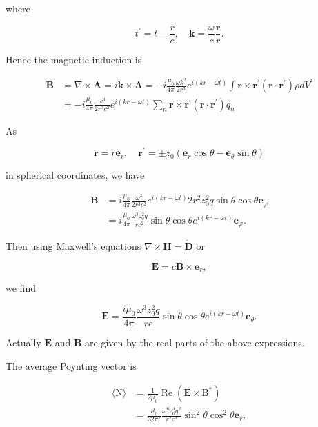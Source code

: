 \documentclass[10pt]{article}
\begin{document}
where

$$
t^{\prime}=t-\frac{r}{c}, \quad \mathbf{k}=\frac{\omega}{c} \frac{\mathbf{r}}{r} .
$$



Hence the magnetic induction is

$$
\begin{aligned}
\mathbf{B} &=\nabla \times \mathbf{A}=i \mathbf{k} \times \mathbf{A}=-i \frac{\mu_{0}}{4 \pi} \frac{\omega k^{2}}{2 r^{3}} e^{i(k r-\omega t)} \int \mathbf{r} \times \mathbf{r}^{\prime}\left(\mathbf{r} \cdot \mathbf{r}^{\prime}\right) \rho d V^{\prime} \\
&=-i \frac{\mu_{0}}{4 \pi} \frac{\omega^{3}}{2 r^{3} c^{2}} e^{i(k r-\omega t)} \sum_{n} \mathbf{r} \times \mathbf{r}^{\prime}\left(\mathbf{r} \cdot \mathbf{r}^{\prime}\right) q_{n}
\end{aligned}
$$

As

$$
\mathbf{r}=r \mathbf{e}_{r}, \quad \mathbf{r}^{\prime}=\pm z_{0}\left(\mathbf{e}_{r} \cos \theta-\mathbf{e}_{\theta} \sin \theta\right)
$$

in spherical coordinates, we have

$$
\begin{aligned}
\mathbf{B} &=i \frac{\mu_{0}}{4 \pi} \frac{\omega^{3}}{2 r^{3} c^{2}} e^{i(k r-\omega t)} 2 r^{2} z_{0}^{2} q \sin \theta \cos \theta \mathbf{e}_{\varphi} \\
&=i \frac{\mu_{0}}{4 \pi} \frac{\omega^{3} z_{0}^{2} q}{r c^{2}} \sin \theta \cos \theta e^{i(k r-\omega t)} \mathbf{e}_{\varphi} .
\end{aligned}
$$

Then using Maxwell's equations $\nabla \times \mathbf{H}=\dot{\mathbf{D}}$ or

$$
\mathbf{E}=c \mathbf{B} \times \mathbf{e}_{r},
$$

we find

$$
\mathbf{E}=\frac{i \mu_{0}}{4 \pi} \frac{\omega^{3} z_{0}^{2} q}{r c} \sin \theta \cos \theta e^{i(k r-\omega t)} \mathbf{e}_{\theta} .
$$

Actually $\mathbf{E}$ and $\mathbf{B}$ are given by the real parts of the above expressions.

 The average Poynting vector is

$$
\begin{aligned}
\langle\mathrm{N}\rangle &=\frac{1}{2 \mu_{0}} \operatorname{Re}\left(\mathbf{E} \times \mathrm{B}^{*}\right) \\
&=\frac{\mu_{0}}{32 \pi^{2}} \frac{\omega^{6} z_{0}^{4} q^{2}}{r^{2} c^{3}} \sin ^{2} \theta \cos ^{2} \theta \mathbf{e}_{r},
\end{aligned}
$$
\end{document}
